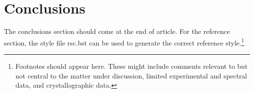 \documentclass[8.5pt,twoside,twocolumn]{article}
\begin{document}
\section{Conclusions}
The conclusions section should come at the end of article. For the reference section, the style file rsc.bst can be used to generate the correct reference style.\footnote[4]{Footnotes should appear here. These might include comments relevant to but not central to the matter under discussion, limited experimental and spectral data, and crystallographic data.}








\footnotesize{
}
\end{document}
